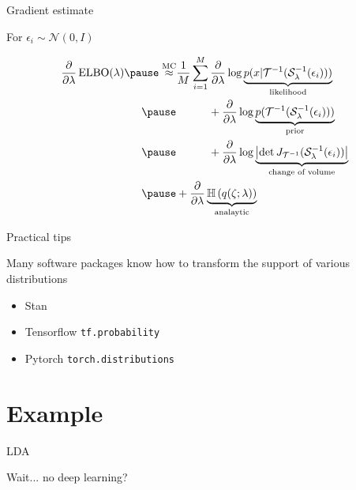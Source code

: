 \documentclass[14pt,dvipsnames]{beamer}
\begin{document}
\begin{frame}{Gradient estimate}

	
	\begin{small}
	For $\epsilon_i \sim \mathcal N(0, I)$
	
	\begin{equation*}
		\begin{aligned}
		\pdv{\lambda}\ELBO(\lambda) \pause \overset{\text{MC}}{\approx}& \frac{1}{M} \sum_{i=1}^M \pdv{\lambda} \log \underbrace{p(x|\inv{\mathcal T}(\inv{\mathcal S}_\lambda(\epsilon_i)))}_{\text{likelihood}} \\ \pause
		&\phantom{\frac{1}{M} \sum}+ \pdv{\lambda} \log \underbrace{p(\inv{\mathcal T}(\inv{\mathcal S}_\lambda(\epsilon_i)))}_{\text{prior}} \\ \pause
		&\phantom{\frac{1}{M} \sum}+ \pdv{\lambda} \log \underbrace{\djac{\inv{\mathcal T}}{\inv{\mathcal S}_\lambda(\epsilon_i)}}_{\text{change of volume}} \\ \pause
		&+ \pdv{\lambda} \underbrace{\Ent{q(\zeta; \lambda)}}_{\text{analaytic}}
		\end{aligned}
	\end{equation*}
	
	\end{small}

\end{frame}

\begin{frame}{Practical tips}

	Many software packages know how to transform the support of various distributions
	\begin{itemize}
		\item Stan
		\item Tensorflow \texttt{tf.probability}
		\item Pytorch \texttt{torch.distributions}
	\end{itemize}
\end{frame}

\section{Example}

\begin{frame}{LDA}
\end{frame}

\begin{frame}{Wait... no deep learning?}
\end{frame}



\begin{frame}[allowframebreaks]


\end{frame}
\end{document}
